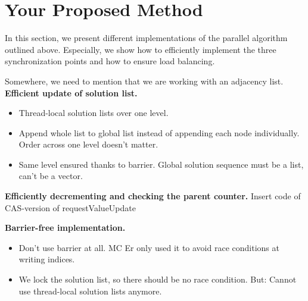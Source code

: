 \documentclass[letterpaper]{article}
\newcommand{\mypar}[1]{{\bf #1.}}
\begin{document}
\begin{invisible}
 
\end{invisible}

\section{Your Proposed Method}\label{sec:yourmethod}
In this section, we present different implementations of the parallel algorithm outlined above.
Especially, we show how to efficiently implement the three synchronization points and how to ensure load balancing.

\begin{invisible}
Somewhere, we need to mention that we are working with an adjacency list.
 \mypar{Efficient update of solution list} %
 \begin{itemize}
  \item Thread-local solution lists over one level.
  \item Append whole list to global list instead of appending each node individually. Order across one level doesn't matter.
  \item Same level ensured thanks to barrier. Global solution sequence must be a list, can't be a vector.
 \end{itemize}

 \mypar{Efficiently decrementing and checking the parent counter} %
 Insert code of CAS-version of requestValueUpdate
 
 \mypar{Barrier-free implementation} %
 \begin{itemize}
  \item Don't use barrier at all. MC Er only used it to avoid race conditions at writing indices.
  \item We lock the solution list, so there should be no race condition. But: Cannot use thread-local solution lists anymore.
 \end{itemize}


\end{invisible}
\end{document}
